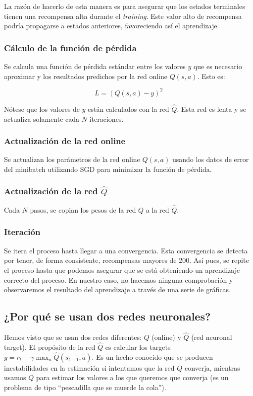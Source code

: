 \documentclass{article}
\begin{document}
La razón de hacerlo de esta manera es para asegurar que los estados terminales tienen una recompensa alta durante el \textit{training}. Este valor alto de recompensa podría propagarse a estados anteriores, favoreciendo así el aprendizaje.

\subsubsection{Cálculo de la función de pérdida}
Se calcula una función de pérdida estándar entre los valores $y$ que es necesario aproximar y los resultados predichos por la red online $Q(s, a)$. Esto es:

$$ L=(Q(s,a) - y)^2 $$

Nótese que los valores de $y$ están calculados con la red $\hat{Q}$. Esta red es lenta y se actualiza solamente cada $N$ iteraciones.

\subsubsection{Actualización de la red online}
Se actualizan los parámetros de la red online $Q(s,a)$ usando los datos de error del minibatch utilizando SGD para minimizar la función de pérdida. 


\subsubsection{Actualización de la red $\hat{Q}$}
Cada $N$ pasos, se copian los pesos de la red $Q$ a la red $\hat{Q}$.

\subsubsection{Iteración}
Se itera el proceso hasta llegar a una convergencia. Esta convergencia se detecta por tener, de forma consistente, recompensas mayores de 200. Así pues, se repite el proceso hasta que podemos asegurar que se está obteniendo un aprendizaje correcto del proceso. En nuestro caso, no hacemos ninguna comprobación y observaremos el resultado del aprendizaje a través de una serie de gráficas.

\subsection{¿Por qué se usan dos redes neuronales?}
Hemos visto que se usan dos redes diferentes: $Q$ (online) y $\hat{Q}$ (red neuronal target). El propósito de la red $\hat{Q}$ es calcular los targets $y = r_t + \gamma \max_{a} \hat{Q}(s_{t+1}, a)$. Es un hecho conocido que se producen inestabilidades en la estimación si intentamos que la red $Q$ converja, mientras usamos $Q$ para estimar los valores a los que queremos que converja (es un problema de tipo ``pescadilla que se muerde la cola'').
\end{document}
